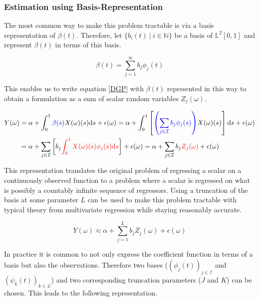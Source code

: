 \documentclass[11pt,twoside,a4paper]{article}
\begin{document}
	\subsubsection{Estimation using Basis-Representation}
	The most common way to make this problem tractable is via a basis representation of $\beta(t)$. Therefore, let $\{b_i(t) \: \vert \: i \in \mathbb{N}\}$ be a basis of $\mathbb{L}^2[0,1]$ and represent $\beta(t)$ in terms of this basis.
	
	\begin{equation}
		\beta(t) = \sum_{j = 1}^{\infty} b_j \phi_j(t)
	\end{equation}
	
	This enables us to write equation \ref{DGP} with $\beta(t)$ represented in this way to obtain a formulation as a sum of scalar random variables $Z_j(\omega)$.
	
	\begin{equation}
		\begin{split}
			Y(\omega) & = \alpha + \int_{0}^{1} {\color{blue}\beta(s)} X(\omega)(s)\mathrm{d}s + \epsilon(\omega)
			= \alpha + \int_{0}^{1}\left[{\color{blue}\left(\sum_{j \in \mathcal{I}} b_j \phi_j(s)\right)} X(\omega)(s) \right]\mathrm{d}s + \epsilon(\omega) \\
			& = \alpha + \sum_{j \in \mathcal{I}} \left[b_j \textcolor{red}{\int_{0}^{1} X(\omega)(s) \phi_j(s)\mathrm{d}s}\right] + \epsilon(\omega)
		      = \alpha + \sum_{j \in \mathcal{I}} b_j \textcolor{red}{Z_j(\omega)} + \epsilon(\omega)
		\end{split}
	\end{equation}
	
	This representation translates the original problem of regressing a scalar on a continuously observed function to a problem where a scalar is regressed on what is possibly a countably infinite sequence of regressors. Using a truncation of the basis at some parameter $L$ can be used to make this problem tractable with typical theory from multivariate regression while staying reasonably accurate.
	
	\begin{equation}
			Y(\omega) \approx \alpha + \sum_{j = 1}^{L} b_j Z_j(\omega) + \epsilon(\omega)
	\end{equation}

	In practice it is common to not only express the coefficient function in terms of a basis but also the observations. Therefore two bases ($\left(\phi_j(t)\right)_{j \in \mathcal{I}}$ and $\left(\psi_k(t)\right)_{k \in \mathcal{L}}$) and two corresponding truncation parameters ($J$ and $K$) can be chosen. This leads to the following representation.
	
\end{document}
